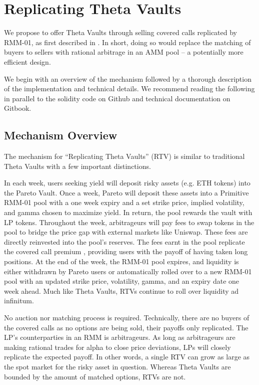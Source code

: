 \documentclass[hidelinks, 12pt]{article}
\begin{document}
\section{Replicating Theta Vaults}

We propose to offer Theta Vaults through selling covered calls replicated by RMM-01, as first described in \cite{sterrett2022replicating}. In short, doing so would replace the matching of buyers to sellers with rational arbitrage in an AMM pool -- a potentially more efficient design.

We begin with an overview of the mechanism followed by a thorough description of the implementation and technical details. We recommend reading the following in parallel to the solidity code on Github and technical documentation on Gitbook.

\subsection{Mechanism Overview}

The mechanism for ``Replicating Theta Vaults'' (RTV) is similar to traditional Theta Vaults with a few important distinctions.

In each week, users seeking yield will deposit risky assets (e.g. ETH tokens) into the Pareto Vault.
Once a week, Pareto will deposit these assets into a Primitive RMM-01 pool with a one week expiry and a set strike price, implied volatility, and gamma chosen to maximize yield. In return, the pool rewards the vault with LP tokens.
Throughout the week, arbitrageurs will pay fees to swap tokens in the pool to bridge the price gap with external markets like Uniswap.
These fees are directly reinvested into the pool's reserves.
The fees earnt in the pool replicate the covered call premium \cite{angeris2021replicating}, providing users with the payoff of having taken long positions.
At the end of the week, the RMM-01 pool expires, and liquidity is either withdrawn by Pareto users or automatically rolled over to a new RMM-01 pool with an updated strike price, volatility, gamma, and an expiry date one week ahead. Much like Theta Vaults, RTVs continue to roll over liquidity ad infinitum.

No auction nor matching process is required. Technically, there are no buyers of the covered calls as no options are being sold, their payoffs only replicated. The LP's counterparties in an RMM is arbitrageurs. As long as arbitrageurs are making rational trades for alpha to close price deviations, LPs will closely replicate the expected payoff. In other words, a single RTV can grow as large as the spot market for the risky asset in question. Whereas Theta Vaults are bounded by the amount of matched options, RTVs are not.
\end{document}
